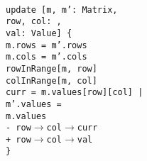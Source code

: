 \begin{myquote}\small{\texttt{\\
\Bpred update [m, m': Matrix,\\
\TD row, col: \Bint,\\
\TD val: Value] \{\\
\TA m.rows = m'.rows\\
\TA m.cols = m'.cols\\
\TA rowInRange[m, row]\\
\TA colInRange[m, col]\\
\TA \Blet curr = m.values[row][col] |\\
\TB m'.values =\\
\TC m.values\\
\TC - row$\rightarrow$col$\rightarrow$curr\\
\TC + row$\rightarrow$col$\rightarrow$val\\
\}
}}
\end{myquote}